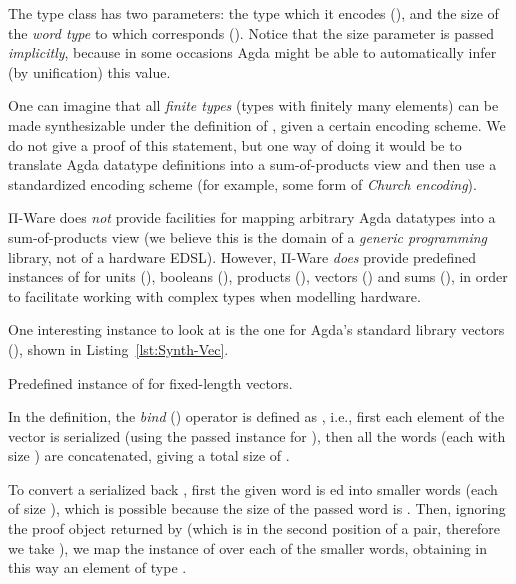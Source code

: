             The type class has two parameters: the type which it encodes (),
            and the size of the \emph{word type} to which  corresponds ().
            Notice that the size parameter is passed \emph{implicitly}, because in some occasions
            Agda might be able to automatically infer (by unification) this value.

            One can imagine that all \emph{finite types} (types with finitely many elements)
            can be made synthesizable under the definition of , given a certain encoding scheme.
            We do not give a proof of this statement, but one way of doing it would be to translate
            Agda datatype definitions into a sum-of-products view and then use a standardized
            encoding scheme (for example, some form of \emph{Church encoding}).

            Π-Ware does \emph{not} provide facilities for mapping arbitrary Agda datatypes into
            a sum-of-products view (we believe this is the domain of a \emph{generic programming} library,
            not of a hardware \ac{EDSL}).
            However, Π-Ware \emph{does} provide predefined instances of  for units (),
            booleans (), products (), vectors () and sums (),
            in order to facilitate working with complex types when modelling hardware.

            One interesting instance to look at is the one for Agda's standard library vectors (),
            shown in Listing~\ref{lst:Synth-Vec}.

            \begin{listing}[ht]
                \caption{Predefined instance of  for fixed-length vectors.\label{lst:Synth-Vec}}
            \end{listing}

            In the  definition,
            the \emph{bind} (\AF{>>=}) operator is defined as   , i.e.,
            first each element of the vector is serialized (using the passed instance for ),
            then all the words (each with size ) are concatenated, giving a total size of
            \AY{(} \AF{*} \AY{)}.

            To convert a serialized  back , first the given word is ed
            into  smaller words (each of size ), which is possible because the size of
            the passed word is \AY{(} \AF{*} \AY{)}.
            Then, ignoring the proof object returned by  (which is in the second position
            of a pair, therefore we take ), we map the  instance of  over
            each of the smaller words, obtaining in this way an element of type
              .

